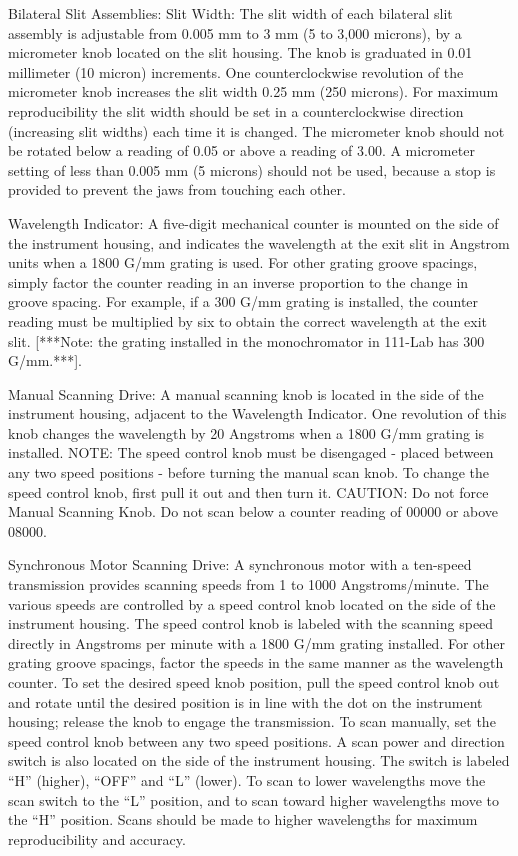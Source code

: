 \documentclass{../lab}
\begin{document}
Bilateral Slit Assemblies: Slit Width: The slit width of each bilateral slit assembly is adjustable from 0.005 mm to 3 mm (5 to 3,000 microns), by a micrometer knob located on the slit housing. The knob is graduated in 0.01 millimeter (10 micron) increments. One counterclockwise revolution of the micrometer knob increases the slit width 0.25 mm (250 microns). For maximum reproducibility the slit width should be set in a counterclockwise direction (increasing slit widths) each time it is changed. The micrometer knob should not be rotated below a reading of 0.05 or above a reading of 3.00. A micrometer setting of less than 0.005 mm (5 microns) should not be used, because a stop is provided to prevent the jaws from touching each other.

Wavelength Indicator: A five-digit mechanical counter is mounted on the side of the instrument housing, and indicates the wavelength at the exit slit in Angstrom units when a 1800 G/mm grating is used. For other grating groove spacings, simply factor the counter reading in an inverse proportion to the change in groove spacing. For example, if a 300 G/mm grating is installed, the counter reading must be multiplied by six to obtain the correct wavelength at the exit slit. [***Note: the grating installed in the monochromator in 111-Lab has 300 G/mm.***].

Manual Scanning Drive: A manual scanning knob is located in the side of the instrument housing, adjacent to the Wavelength Indicator. One revolution of this knob changes the wavelength by 20 Angstroms when a 1800 G/mm grating is installed. NOTE: The speed control knob must be disengaged - placed between any two speed positions - before turning the manual scan knob. To change the speed control knob, first pull it out and then turn it. CAUTION: Do not force Manual Scanning Knob. Do not scan below a counter reading of 00000 or above 08000.

Synchronous Motor Scanning Drive: A synchronous motor with a ten-speed transmission provides scanning speeds from 1 to 1000 Angstroms/minute. The various speeds are controlled by a speed control knob located on the side of the instrument housing. The speed control knob is labeled with the scanning speed directly in Angstroms per minute with a 1800 G/mm grating installed. For other grating groove spacings, factor the speeds in the same manner as the wavelength counter. To set the desired speed knob position, pull the speed control knob out and rotate until the desired position is in line with the dot on the instrument housing; release the knob to engage the transmission. To scan manually, set the speed control knob between any two speed positions. A scan power and direction switch is also located on the side of the instrument housing. The switch is labeled ``H'' (higher), ``OFF'' and ``L'' (lower). To scan to lower wavelengths move the scan switch to the ``L'' position, and to scan toward higher wavelengths move to the ``H'' position. Scans should be made to higher wavelengths for maximum reproducibility and accuracy.
\end{document}
